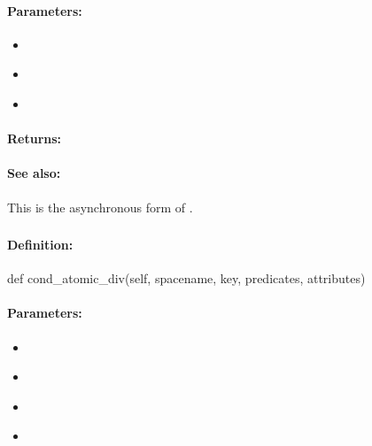 \paragraph{Parameters:}
\begin{itemize}[noitemsep]
\item {}\\

\item {}\\

\item {}\\

\end{itemize}

\paragraph{Returns:}


\paragraph{See also:}  This is the asynchronous form of .

\pagebreak
\subsubsection{}
\label{api:python:cond_atomic_div}


\paragraph{Definition:}
\begin{pythoncode}
def cond_atomic_div(self, spacename, key, predicates, attributes)
\end{pythoncode}

\paragraph{Parameters:}
\begin{itemize}[noitemsep]
\item {}\\

\item {}\\

\item {}\\

\item {}\\

\end{itemize}


